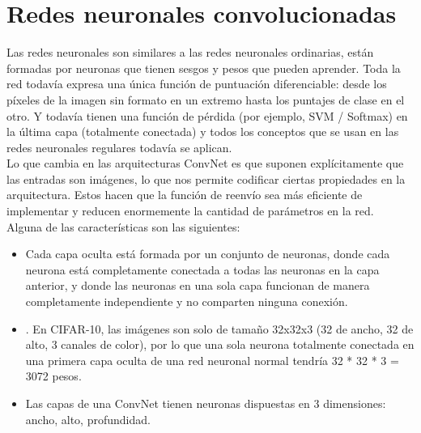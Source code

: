 \documentclass[]{report}
\begin{document}
\section{Redes neuronales convolucionadas}
Las redes neuronales son similares a las redes neuronales ordinarias, están formadas por neuronas que tienen sesgos y pesos que pueden aprender.  Toda la red todavía expresa una única función de puntuación diferenciable: desde los píxeles de la imagen sin formato en un extremo hasta los puntajes de clase en el otro. Y todavía tienen una función de pérdida (por ejemplo, SVM / Softmax) en la última capa (totalmente conectada) y todos los conceptos que se usan en las redes neuronales regulares todavía se aplican.\\
Lo que cambia en las arquitecturas ConvNet es que suponen explícitamente que las entradas son imágenes, lo que nos permite codificar ciertas propiedades en la arquitectura. Estos hacen que la función de reenvío sea más eficiente de implementar y reducen enormemente la cantidad de parámetros en la red.\\
Alguna de las características son las siguientes:\cite{ASH:2013:Online}
\begin{itemize}
	\item Cada capa oculta está formada por un conjunto de neuronas, donde cada neurona está completamente conectada a todas las neuronas en la capa anterior, y donde las neuronas en una sola capa funcionan de manera completamente independiente y no comparten ninguna conexión.
	\item . En CIFAR-10, las imágenes son solo de tamaño 32x32x3 (32 de ancho, 32 de alto, 3 canales de color), por lo que una sola neurona totalmente conectada en una primera capa oculta de una red neuronal normal tendría 32 * 32 * 3 = 3072 pesos.
	\item Las capas de una ConvNet tienen neuronas dispuestas en 3 dimensiones: ancho, alto, profundidad. 
\end{itemize}
\end{document}

